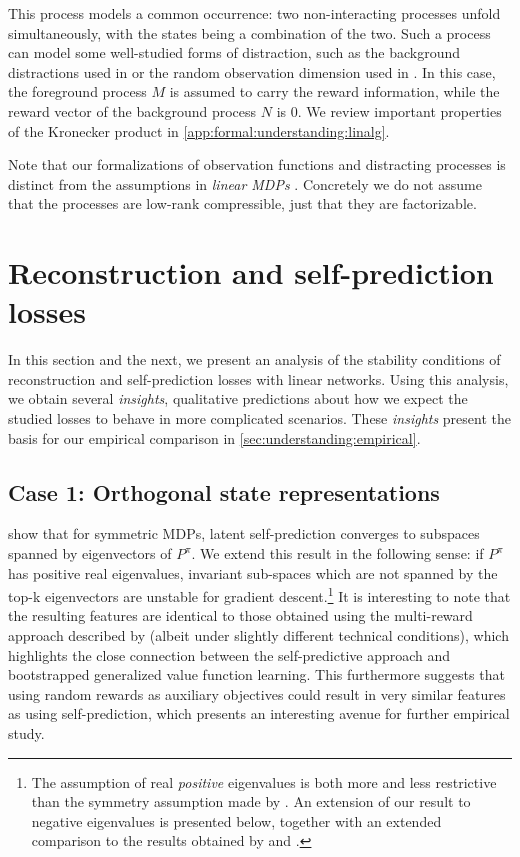 This process models a common occurrence: two non-interacting processes unfold simultaneously, with the states being a combination of the two.
Such a process can model some well-studied forms of distraction, such as the background distractions used in \textcite{stone2021thedc} or the random observation dimension used in \textcite{nikishin2021control,voelcker2022value}.
In this case, the foreground process $M$ is assumed to carry the reward information, while the reward vector of the background process $N$ is 0.
We review important properties of the Kronecker product in \autoref{app:formal:understanding:linalg}.


Note that our formalizations of observation functions and distracting processes is distinct from the assumptions in \emph{linear MDPs} \parencite{jin2020provably}. Concretely we do not assume that the processes are low-rank compressible, just that they are factorizable.

\section{Reconstruction and self-prediction losses}
\label{sec:understanding:stand_alone_tasks}

In this section and the next, we present an analysis of the stability conditions of reconstruction and self-prediction losses with linear networks.
Using this analysis, we obtain several \emph{insights}, qualitative predictions about how we expect the studied losses to behave in more complicated scenarios.
These \emph{insights} present the basis for our empirical comparison in \autoref{sec:understanding:empirical}.

\subsection{Case 1: Orthogonal state representations}


\textcite{tang2022understanding} show that for symmetric MDPs, latent self-prediction converges to subspaces spanned by eigenvectors of $P^\pi$. 
We extend this result in the following sense: if $P^\pi$ has positive real eigenvalues, invariant sub-spaces which are not spanned by the top-k eigenvectors are unstable for gradient descent.\footnote{The assumption of real \emph{positive} eigenvalues is both more and less restrictive than the symmetry assumption made by \textcite{tang2022understanding}. An extension of our result to negative eigenvalues is presented below, together with an extended comparison to the results obtained by \textcite{tang2022understanding} and \textcite{lelan2023bootstrapped}.}
It is interesting to note that the resulting features are identical to those obtained using the multi-reward approach described by \textcite{lelan2023bootstrapped} (albeit under slightly different technical conditions), which highlights the close connection between the self-predictive approach and bootstrapped generalized value function learning.
This furthermore suggests that using random rewards as auxiliary objectives \parencite{farebrother2023protovalue} could result in very similar features as using self-prediction, which presents an interesting avenue for further empirical study.


